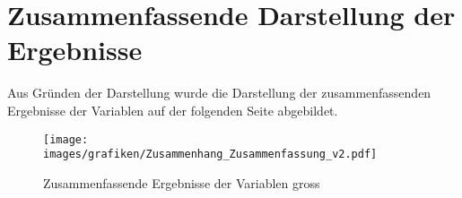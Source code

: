 %
%
\glsresetall

\let\raggedsection\centering 
\chapter{Zusammenfassende Darstellung der Ergebnisse}\label{anhang.zusammenfassendeDarstellung}
\let\raggedsection\raggedright 
\begin{RaggedRight}
Aus Gründen der Darstellung wurde die Darstellung der zusammenfassenden Ergebnisse der Variablen auf der folgenden Seite abgebildet.
\begin{figure}[h]
    \centering
    \texttt{[image: images/grafiken/Zusammenhang\_Zusammenfassung\_v2.pdf]}
     \caption{Zusammenfassende Ergebnisse der Variablen gross}
     \label{pic.ergebniss.zusammenfassungGross}
\end{figure}

\end{RaggedRight}

